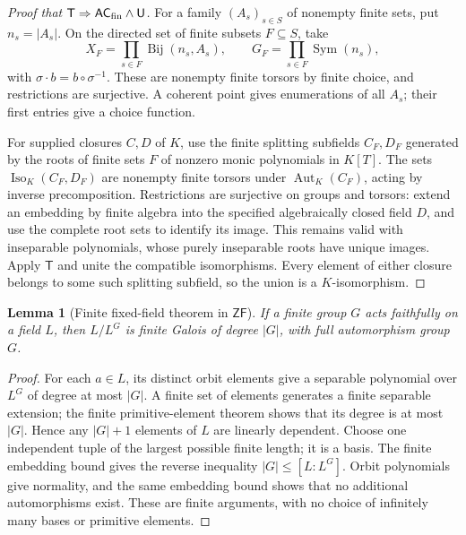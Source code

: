 \documentclass[11pt,a4paper]{article}
\newtheorem{lemma}[theorem]{Lemma}
\theoremstyle{definition}\newtheorem{definition}[theorem]{Definition}
\theoremstyle{remark}\newtheorem{remark}[theorem]{Remark}
\newcommand{\ZF}{\mathsf{ZF}}\newcommand{\ZFA}{\mathsf{ZFA}}
\newcommand{\ACfin}{\mathsf{AC}_{\mathrm{fin}}}
\DeclareMathOperator{\Iso}{Iso}\DeclareMathOperator{\Aut}{Aut}
\begin{document}
\begin{proof}[Proof that $\mathsf T\Rightarrow\ACfin\wedge\U$]
For a family $(A_s)_{s\in S}$ of nonempty finite sets, put $n_s=|A_s|$. On the directed set of finite subsets $F\subseteq S$, take
\[
X_F=\prod_{s\in F}\operatorname{Bij}(n_s,A_s),
\qquad G_F=\prod_{s\in F}\operatorname{Sym}(n_s),
\]
with $\sigma\cdot b=b\circ\sigma^{-1}$. These are nonempty finite torsors by finite choice, and restrictions are surjective. A coherent point gives enumerations of all $A_s$; their first entries give a choice function.

For supplied closures $C,D$ of $K$, use the finite splitting subfields $C_F,D_F$ generated by the roots of finite sets $F$ of nonzero monic polynomials in $K[T]$. The sets $\Iso_K(C_F,D_F)$ are nonempty finite torsors under $\Aut_K(C_F)$, acting by inverse precomposition. Restrictions are surjective on groups and torsors: extend an embedding by finite algebra into the specified algebraically closed field $D$, and use the complete root sets to identify its image. This remains valid with inseparable polynomials, whose purely inseparable roots have unique images. Apply $\mathsf T$ and unite the compatible isomorphisms. Every element of either closure belongs to some such splitting subfield, so the union is a $K$-isomorphism.
\end{proof}

\begin{lemma}[Finite fixed-field theorem in $\ZF$]\label{lem:finiteartin}
If a finite group $G$ acts faithfully on a field $L$, then $L/L^G$ is finite Galois of degree $|G|$, with full automorphism group $G$.
\end{lemma}
\begin{proof}
For each $a\in L$, its distinct orbit elements give a separable polynomial over $L^G$ of degree at most $|G|$. A finite set of elements generates a finite separable extension; the finite primitive-element theorem shows that its degree is at most $|G|$. Hence any $|G|+1$ elements of $L$ are linearly dependent. Choose one independent tuple of the largest possible finite length; it is a basis. The finite embedding bound gives the reverse inequality $|G|\leq[L:L^G]$. Orbit polynomials give normality, and the same embedding bound shows that no additional automorphisms exist. These are finite arguments, with no choice of infinitely many bases or primitive elements.
\end{proof}
\end{document}
